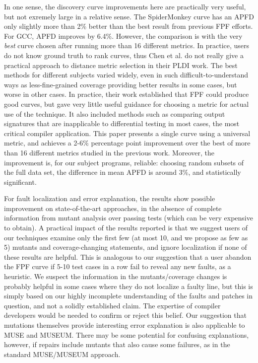 In one sense, the discovery curve improvements here are practically very useful, but not exremely large in a relative sense.  The SpiderMonkey curve has an APFD only slightly more than 2\% better than the best result from previous FPF efforts.  For GCC, APFD improves by 6.4\%.  However, the comparison is with the very \emph{best} curve chosen after running more than 16 different metrics.  In practice, users do not know ground truth to rank curves, thus Chen et al. \cite{PLDI13} do not really give a practical approach to distance metric selection in their PLDI work.  The best methods for different subjects varied widely, even in such difficult-to-understand ways as less-fine-grained coverage providing better results in some cases, but worse in other cases.   In practice, their work established that FPF could produce good curves, but gave very little useful guidance for choosing a metric for actual use of the technique.  It also included methods such as comparing output signatures that are inapplicable to differential testing in most cases, the most critical compiler application.  This paper presents a single curve using a universal metric, and achieves a 2-6\% percentage point improvement over the best of more than 16 different metrics studied in the previous work.  Moreover, the improvement is, for our subject programs, reliable:  choosing random subsets of the full data set, the difference in mean APFD is around 3\%, and statistically significant.

For fault localization and error explanation, the results show possible improvement on state-of-the-art approaches, in the absence of complete information from mutant analysis over passing tests (which can be very expensive to obtain).  A practical impact of the results reported is that we suggest users of our techniques examine only the first few (at most 10, and we propose as few as 5) mutants and coverage-changing statements, and ignore localization if none of these results are helpful.  This is analogous to our suggestion that a user abandon the FPF curve if 5-10 test cases in a row fail to reveal any new faults, as a heuristic.  We suspect the information in the mutants/coverage changes is probably helpful in some cases where they do not localize a faulty line, but this is simply based on our highly incomplete understanding of the faults and patches in question, and not a solidly established claim.  The expertise of compiler developers would be needed to confirm or reject this belief.  Our suggestion that mutations themselves provide interesting error explanation is also applicable to MUSE and MUSEUM.  There may be some potential for confusing explanations, however, if repairs include mutants that also cause some failures, as in the standard MUSE/MUSEUM approach.  

